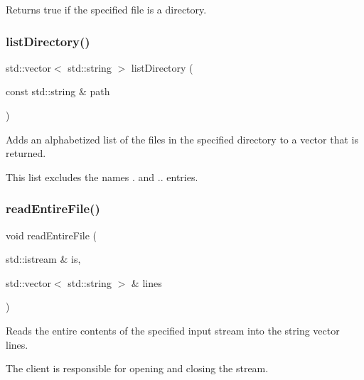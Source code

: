 Returns {\ttfamily true} if the specified file is a directory. 

\mbox{\label{namespacesgl_1_1priv_1_1filelib_afe8ff05c7d9ab00c7b8a4d7f6036a0b2}} 
\subsubsection{\texorpdfstring{list\+Directory()}{listDirectory()}}
{\footnotesize\ttfamily std\+::vector$<$ std\+::string $>$ list\+Directory (\begin{DoxyParamCaption}\item[{const std\+::string \&}]{path }\end{DoxyParamCaption})}



Adds an alphabetized list of the files in the specified directory to a vector that is returned. 

This list excludes the names {\ttfamily .} and {\ttfamily ..} entries. \mbox{\label{namespacesgl_1_1priv_1_1filelib_ad01c76fd8c527f7dd7dee39fb4597739}} 
\subsubsection{\texorpdfstring{read\+Entire\+File()}{readEntireFile()}\hspace{0.1cm}{\footnotesize\ttfamily [1/2]}}
{\footnotesize\ttfamily void read\+Entire\+File (\begin{DoxyParamCaption}\item[{std\+::istream \&}]{is,  }\item[{std\+::vector$<$ std\+::string $>$ \&}]{lines }\end{DoxyParamCaption})}



Reads the entire contents of the specified input stream into the string vector {\ttfamily lines}. 

The client is responsible for opening and closing the stream. \mbox{\label{namespacesgl_1_1priv_1_1filelib_a86c5d6683613361160de27acd5f5a243}} 
